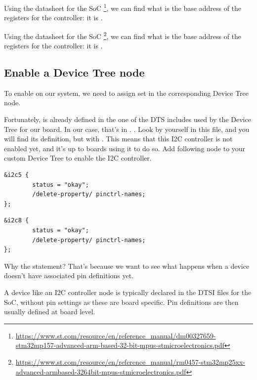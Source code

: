 \if{}
Using the datasheet for the SoC
\footnote{\url{https://www.st.com/resource/en/reference_manual/dm00327659-stm32mp157-advanced-arm-based-32-bit-mpus-stmicroelectronics.pdf}},
we can find what is the base address of the registers for the
 controller: it is .
\fi

\if{}
Using the datasheet for the SoC
\footnote{\url{https://www.st.com/resource/en/reference_manual/rm0457-stm32mp25xx-advanced-armbased-3264bit-mpus-stmicroelectronics.pdf}},
we can find what is the base address of the registers for the
 controller: it is .
\fi

\subsection{Enable a Device Tree node}

To enable \busname on our system, we need to assign set  in the corresponding Device Tree node.

Fortunately, \busname is already defined in the one of the DTS includes
used by the Device Tree for our board. In our case, that's in
\if{}
.
\fi
\if{}
.
\fi
Look by yourself in this
file, and you will find its definition, but with . This means that this I2C controller is not enabled yet,
and it's up to boards using it to do so. Add following node to your custom Device
Tree to enable the I2C controller.

\if{}
\begin{verbatim}
&i2c5 {
        status = "okay";
        /delete-property/ pinctrl-names;
};
\end{verbatim}
\fi
\if{}
\begin{verbatim}
&i2c8 {
        status = "okay";
        /delete-property/ pinctrl-names;
};
\end{verbatim}
\fi

Why the  statement? That's because we want
to see what happens when a device doesn't have associated pin
definitions yet.

A device like an I2C controller node is typically declared in the DTSI
files for the SoC, without pin settings as these are board
specific. Pin definitions are then usually defined at board level.

